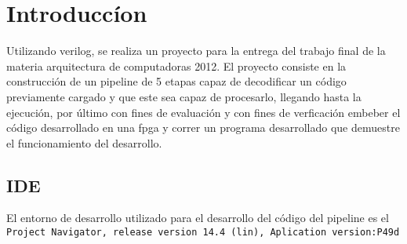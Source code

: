 \section{Introducc\'ion}

Utilizando verilog, se realiza un proyecto para la entrega del trabajo final de la materia arquitectura de computadoras 2012. El proyecto consiste en la construcción de un pipeline de 5 etapas capaz de decodificar un código previamente cargado y que este sea capaz de procesarlo, llegando hasta la ejecución, por último con fines de evaluación y con fines de verficaci\'on embeber el c\'odigo desarrollado en una fpga y correr un programa desarrollado que demuestre el funcionamiento del desarrollo.

\subsection{IDE}
El entorno de desarrollo utilizado para el desarrollo del c\'odigo del pipeline es el \texttt{Project Navigator, release version 14.4 (lin), Aplication version:P49d} 